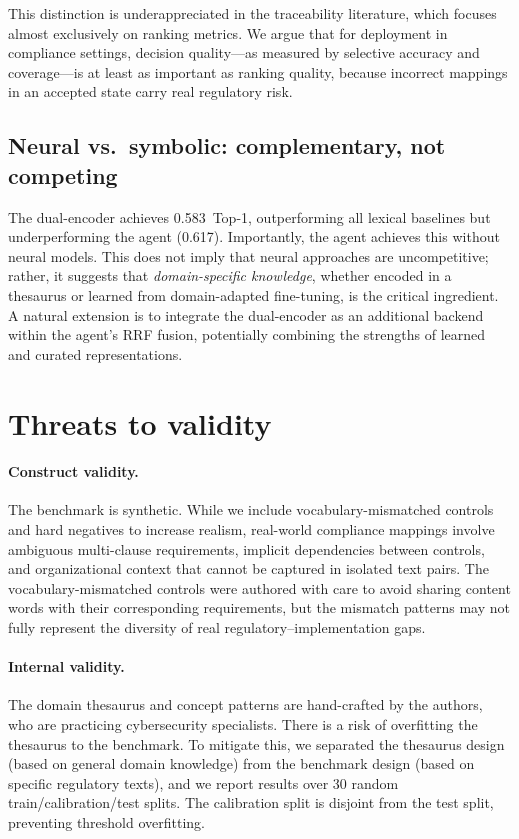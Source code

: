 \documentclass[a4paper,fleqn]{cas-sc}
\begin{document}
This distinction is underappreciated in the traceability literature, which focuses almost exclusively on ranking metrics.
We argue that for deployment in compliance settings, decision quality---as measured by selective accuracy and coverage---is at least as important as ranking quality, because incorrect mappings in an accepted state carry real regulatory risk.

\subsection{Neural vs.\ symbolic: complementary, not competing}

The dual-encoder achieves 0.583~Top-1, outperforming all lexical baselines but underperforming the agent (0.617).
Importantly, the agent achieves this without neural models.
This does not imply that neural approaches are uncompetitive; rather, it suggests that \emph{domain-specific knowledge}, whether encoded in a thesaurus or learned from domain-adapted fine-tuning, is the critical ingredient.
A natural extension is to integrate the dual-encoder as an additional backend within the agent's RRF fusion, potentially combining the strengths of learned and curated representations.


\section{Threats to validity}
\label{sec:threats}

\paragraph{Construct validity.}
The benchmark is synthetic.
While we include vocabulary-mismatched controls and hard negatives to increase realism, real-world compliance mappings involve ambiguous multi-clause requirements, implicit dependencies between controls, and organizational context that cannot be captured in isolated text pairs.
The vocabulary-mismatched controls were authored with care to avoid sharing content words with their corresponding requirements, but the mismatch patterns may not fully represent the diversity of real regulatory--implementation gaps.

\paragraph{Internal validity.}
The domain thesaurus and concept patterns are hand-crafted by the authors, who are practicing cybersecurity specialists.
There is a risk of overfitting the thesaurus to the benchmark.
To mitigate this, we separated the thesaurus design (based on general domain knowledge) from the benchmark design (based on specific regulatory texts), and we report results over 30 random train/calibration/test splits.
The calibration split is disjoint from the test split, preventing threshold overfitting.
\end{document}
